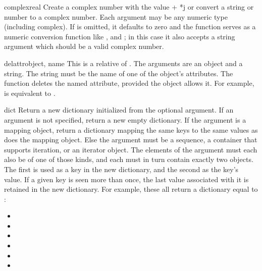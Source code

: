 \begin{funcdesc}{complex}{real}
  Create a complex number with the value  + *j or
  convert a string or number to a complex number.
  Each argument may be any numeric type (including complex).
  If  is omitted, it defaults to zero and the function
  serves as a numeric conversion function like ,
   and ; in this case it also
  accepts a string argument which should be a valid complex number.
\end{funcdesc}

\begin{funcdesc}{delattr}{object, name}
  This is a relative of .  The arguments are an
  object and a string.  The string must be the name
  of one of the object's attributes.  The function deletes
  the named attribute, provided the object allows it.  For example,
   is equivalent to
  .
\end{funcdesc}

\begin{funcdesc}{dict}{}
  Return a new dictionary initialized from the optional argument.
  If an argument is not specified, return a new empty dictionary.
  If the argument is a mapping object, return a dictionary mapping the
  same keys to the same values as does the mapping object.
  Else the argument must be a sequence, a container that supports
  iteration, or an iterator object.  The elements of the argument must
  each also be of one of those kinds, and each must in turn contain
  exactly two objects.  The first is used as a key in the new dictionary,
  and the second as the key's value.  If a given key is seen more than
  once, the last value associated with it is retained in the new
  dictionary.
  For example, these all return a dictionary equal to
  :

  \begin{itemize}
    \item {}
    \item {}
    \item {}
    \item {}
    \item {}
    \item {}
  \end{itemize}
\end{funcdesc}

